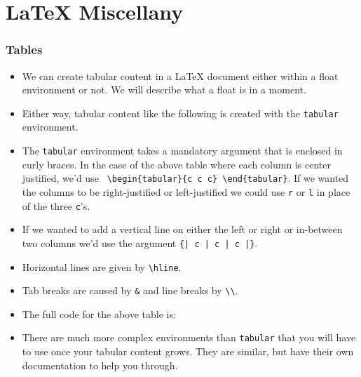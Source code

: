 \part{\LaTeX{} Miscellany}

\section{Tables}
\begin{itemize}
\item We can create tabular content in a \LaTeX{} document either within
  a float environment or not. We will describe what a float is in a moment.

\item Either way, tabular content like the following is created with
  the \texttt{tabular} environment.



\item The \texttt{tabular} environment takes a mandatory argument that is
  enclosed in curly braces. In the case of the above table where each column is
  center justified, we'd use \verb! \begin{tabular}{c c c} \end{tabular}!. If we
  wanted the columns to be right-justified or left-justified we could use
  \texttt{r} or \texttt{l} in place of the three \verb=c='s.

\item If we wanted to add a vertical line on either the left or right or in-between two columns we'd use the  argument \verb!{| c | c | c |}!.

\item Horizontal lines are given by \verb!\hline!.

\item Tab breaks are caused by \verb!&! and line breaks by \verb!\\!.

\item The full code for the above table is:\\
  

\item There are much more complex environments than \texttt{tabular} that you
  will have to use once your tabular content grows. They are similar, but have
  their own documentation to help you through.

\end{itemize}

